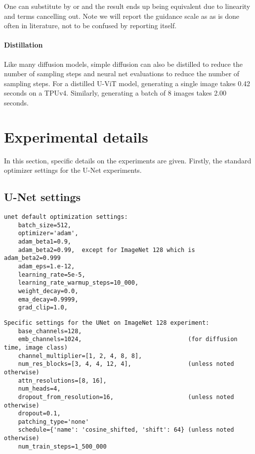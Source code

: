 \documentclass[nohyperref]{article}
\theoremstyle{plain}
\theoremstyle{definition}
\theoremstyle{remark}
\begin{document}
One can substitute  by  or  and the result ends up being equivalent due to linearity and terms cancelling out. Note we will report the guidance scale as  as is done often in literature, not to be confused by reporting  itself.

\paragraph{Distillation}
Like many diffusion models, simple diffusion can also be distilled to reduce the number of sampling steps and neural net evaluations \citep{meng2022ondistillation} to reduce the number of sampling steps. For a distilled U-ViT model, generating a single image takes 0.42 seconds on a TPUv4. Similarly, generating a batch of 8 images takes 2.00 seconds.

\section{Experimental details}
\label{app:experimental_details}

In this section, specific details on the experiments are given. Firstly, the standard optimizer settings for the U-Net experiments.
\subsection{U-Net settings}
\begin{lstlisting}
unet default optimization settings:
    batch_size=512,
    optimizer='adam',
    adam_beta1=0.9,
    adam_beta2=0.99,  except for ImageNet 128 which is adam_beta2=0.999
    adam_eps=1.e-12,  
    learning_rate=5e-5,
    learning_rate_warmup_steps=10_000,
    weight_decay=0.0,
    ema_decay=0.9999,
    grad_clip=1.0,
\end{lstlisting}


\begin{lstlisting}
Specific settings for the UNet on ImageNet 128 experiment:
    base_channels=128,
    emb_channels=1024,                              (for diffusion time, image class)
    channel_multiplier=[1, 2, 4, 8, 8],
    num_res_blocks=[3, 4, 4, 12, 4],                (unless noted otherwise)
    attn_resolutions=[8, 16],
    num_heads=4,
    dropout_from_resolution=16,                     (unless noted otherwise)
    dropout=0.1,
    patching_type='none'
    schedule={'name': 'cosine_shifted, 'shift': 64} (unless noted otherwise)
    num_train_steps=1_500_000
\end{lstlisting}
\end{document}
